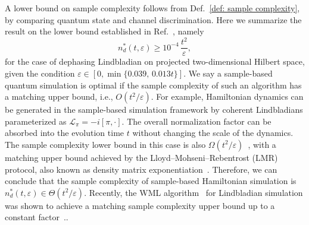 \documentclass[superscriptaddress,amsmath,amssymb,aps,pra,letterpaper,tightenlines,notitlepages,12pt]{revtex4-2}
\begin{document}
A lower bound on sample complexity follows from Def.~\ref{def: sample complexity}, by comparing quantum state and channel discrimination. Here we summarize the result on the lower bound established in Ref.~\cite[Theorem 12]{go2025SamplebasedHamiltonianLindbladian}, namely
\begin{equation}\label{eq:lower_bound_result}
n^{\ast}_d(t,\varepsilon) \geq 10^{-4}\,\frac{t^{2}}{\varepsilon},
\end{equation}
for the case of dephasing Lindbladian on projected two-dimensional Hilbert space, given the condition $\varepsilon \in [0, \min\{0.039,\,0.013 t\}]$. We say a sample-based quantum simulation is optimal if the sample complexity of such an algorithm has a matching upper bound, i.e., $O(t^2/\varepsilon)$. For example, Hamiltonian dynamics can be generated in the sample-based simulation framework by coherent Lindbladians parameterized as $\mathcal{L}_\pi = -i[\pi,\cdot]$. The overall normalization factor can be absorbed into the evolution time $t$ without changing the scale of the dynamics. The sample complexity lower bound in this case is also $\Omega(t^2/\varepsilon)$~\cite{wei2024SimulatingNoncompletelyPositive, go2025SamplebasedHamiltonianLindbladian}, with a matching upper bound achieved by the Lloyd--Mohseni--Rebentrost (LMR) protocol, also known as density matrix exponentiation~\cite{lloyd2014QuantumPrincipalComponent, kimmel2017HamiltonianSimulationOptimal, wei2024SimulatingNoncompletelyPositive, go2025SamplebasedHamiltonianLindbladian}. Therefore, we can conclude that the sample complexity of sample-based Hamiltonian simulation is $n^{\ast}_d(t,\varepsilon) \in \Theta({t^{2}}/{\varepsilon})$. Recently, the WML algorithm~\cite{patel2023WaveMatrixLindbladization, patel2023WaveMatrixLindbladizationa} for Lindbladian simulation was shown to achieve a matching sample complexity upper bound up to a constant factor~\cite{go2025SamplebasedHamiltonianLindbladian}..
\end{document}
